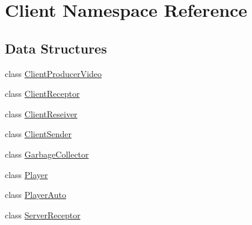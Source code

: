 \hypertarget{namespace_client}{}\section{Client Namespace Reference}
\label{namespace_client}
\subsection*{Data Structures}
\begin{DoxyCompactItemize}
\item 
class \hyperlink{class_client_1_1_client_producer_video}{Client\+Producer\+Video}
\item 
class \hyperlink{class_client_1_1_client_receptor}{Client\+Receptor}
\item 
class \hyperlink{class_client_1_1_client_reseiver}{Client\+Reseiver}
\item 
class \hyperlink{class_client_1_1_client_sender}{Client\+Sender}
\item 
class \hyperlink{class_client_1_1_garbage_collector}{Garbage\+Collector}
\item 
class \hyperlink{class_client_1_1_player}{Player}
\item 
class \hyperlink{class_client_1_1_player_auto}{Player\+Auto}
\item 
class \hyperlink{class_client_1_1_server_receptor}{Server\+Receptor}
\end{DoxyCompactItemize}
